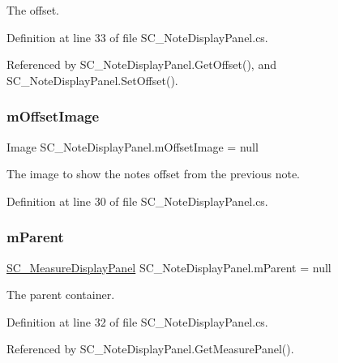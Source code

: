 The offset. 



Definition at line 33 of file S\+C\+\_\+\+Note\+Display\+Panel.\+cs.



Referenced by S\+C\+\_\+\+Note\+Display\+Panel.\+Get\+Offset(), and S\+C\+\_\+\+Note\+Display\+Panel.\+Set\+Offset().

\mbox{\label{group___s_c___n_d_p_priv_var_ga177d14cf2cac316a0bfc2e1096256a0c}} 
\subsubsection{\texorpdfstring{m\+Offset\+Image}{mOffsetImage}}
{\footnotesize\ttfamily Image S\+C\+\_\+\+Note\+Display\+Panel.\+m\+Offset\+Image = null\hspace{0.3cm}{\ttfamily [private]}}



The image to show the note\textquotesingle{}s offset from the previous note. 



Definition at line 30 of file S\+C\+\_\+\+Note\+Display\+Panel.\+cs.

\mbox{\label{group___s_c___n_d_p_priv_var_ga360017747d9ed8910ddd4b3309477710}} 
\subsubsection{\texorpdfstring{m\+Parent}{mParent}}
{\footnotesize\ttfamily \hyperlink{class_s_c___measure_display_panel}{S\+C\+\_\+\+Measure\+Display\+Panel} S\+C\+\_\+\+Note\+Display\+Panel.\+m\+Parent = null\hspace{0.3cm}{\ttfamily [private]}}



The parent container. 



Definition at line 32 of file S\+C\+\_\+\+Note\+Display\+Panel.\+cs.



Referenced by S\+C\+\_\+\+Note\+Display\+Panel.\+Get\+Measure\+Panel().

